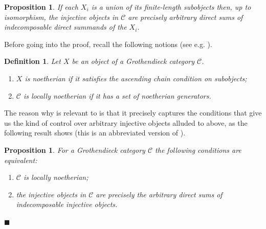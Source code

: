 \documentclass[11pt]{article}
\theoremstyle{plain}
\newtheorem{proposition}[lemma]{Proposition}
\theoremstyle{nonumberplain}
\theoremstyle{plain}
\newtheorem{definition}[lemma]{Definition}
\newtheorem{remark}[lemma]{Remark}
\theoremstyle{nonumberplain}
\newcommand\cC{\mathcal C}
\DeclareMathOperator{\Hom}{\mathrm{Hom}}
\newcommand{\qedhere}{\mbox{}\hfill\ensuremath{\blacksquare}}
\begin{document}
 


\begin{proposition}\label{pr.loc-noe}
  If each $X_i$ is a union of its finite-length subobjects then, up to isomorphism,  the
  injective objects in $\cC$ are precisely arbitrary direct sums of
  indecomposable direct summands of the $X_i$. 
\end{proposition}



Before going into the proof, recall the following notions (see
e.g. \cite[$\S$5.7 and $\S$5.8]{groth}).



\begin{definition}\label{def.loc-noe}
  Let $X$ be an object of a Grothendieck category $\cC$.
  \begin{enumerate}
   \item $X$ is {\it noetherian} if it satisfies the ascending chain condition on subobjects;
   \item $\cC$ is {\it locally noetherian} if it has a set of
      noetherian generators.
  \end{enumerate}
\end{definition}





The reason why  is relevant to  is
that it precisely captures the conditions that give us the kind of
control over arbitrary injective objects alluded to above, as the
following result shows (this is an abbreviated version of
\cite[Theorems 5.8.7, 5.8.11]{groth}).



 
\begin{proposition}\label{pr.loc-noe-aux}
For a Grothendieck category $\cC$ the following conditions are equivalent{:}
\begin{enumerate}
  \item $\cC$ is locally noetherian;
  \item {the injective objects in $\cC$} are precisely the {arbitrary}
    direct sums of indecomposable injective objects.
\end{enumerate}
\qedhere
\end{proposition}
\end{document}
